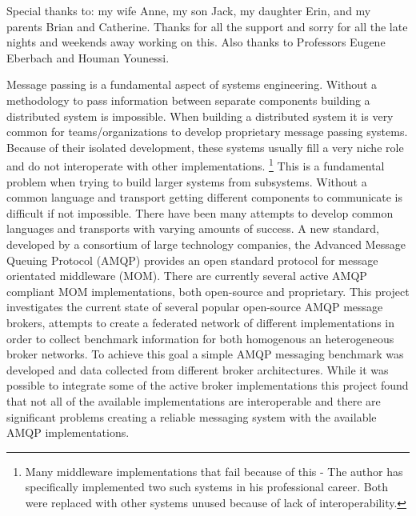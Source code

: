 \documentclass{thesis}
\author{David Joe Wade}
\begin{document}
 
\listoftodos
\titlepage            	 %
\tableofcontents          %
\listoftables          	 %
\listoffigures         	 %

Special thanks to: my wife Anne, my son Jack, my daughter Erin, and my parents Brian and Catherine.  Thanks for all the support and sorry for all the late nights and weekends away working on this.  Also thanks to Professors Eugene Eberbach and Houman Younessi.

Message passing is a fundamental aspect of systems engineering.  Without a methodology to pass information between separate components building a distributed system is impossible.  When building a distributed system it is very common for teams/organizations to develop proprietary message passing systems.  Because of their isolated development, these systems usually fill a very niche role and do not interoperate with other implementations. \footnote{Many middleware implementations that fail because of this - The author has specifically implemented two such systems in his professional career.  Both were replaced with other systems unused because of lack of interoperability.} This is a fundamental problem when trying to build larger systems from subsystems.  Without a common language and transport getting different components to communicate is difficult if not impossible.  There have been many attempts to develop common languages and transports with varying amounts of success.  A new standard, developed by a consortium of large technology companies, the Advanced Message Queuing Protocol (AMQP) provides an open standard protocol for message orientated middleware (MOM).  There are currently several active AMQP compliant MOM implementations, both open-source and proprietary.  This project investigates the current state of several popular open-source AMQP message brokers, attempts to create a federated network of different implementations in order to collect benchmark information for both homogenous an heterogeneous broker networks.  To achieve this goal a simple AMQP messaging benchmark was developed and data collected from different broker architectures.  While it was possible to integrate some of the active broker implementations this project found that not all of the available implementations are interoperable and there are significant problems creating a reliable messaging system with the available AMQP implementations.  
\end{document}
